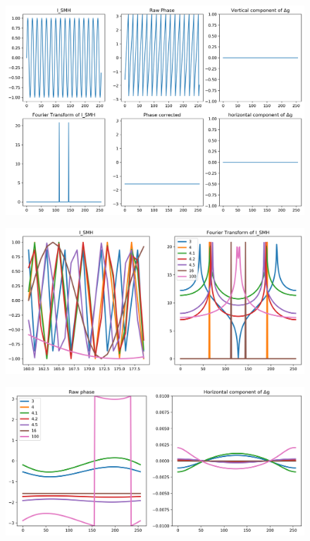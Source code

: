 \documentclass[12pt, titlepage]{article}
\begin{document}
\begin{figure}[H]
\begin{center}
\includegraphics[scale=0.5]{Figures/Test_2_explanation_1D.png}
\caption{}
\label{fig:Test_2_explaination_1D}
\end{center}
\end{figure}

\begin{figure}[H]
\begin{center}
\includegraphics[scale=0.5]{Figures/Test_2_test_cases.png}
\caption{}
\label{fig:Test_2_Test_cases}
\end{center}
\end{figure}

\begin{figure}[H]
\begin{center}
\includegraphics[scale=0.5]{Figures/Test_2_test_results.png}
\caption{}
\label{fig:Test_2_Test_results}
\end{center}
\end{figure}
\end{document}
